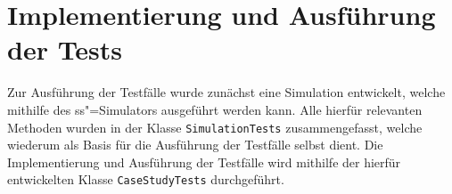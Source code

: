 \chapter{Implementierung und Ausführung der Tests}
\label{chap:testExecution}

Zur Ausführung der Testfälle wurde zunächst eine Simulation entwickelt, welche mithilfe des \ac{ss}"=Simulators ausgeführt werden kann.
Alle hierfür relevanten Methoden wurden in der Klasse \texttt{SimulationTests} zusammengefasst, welche wiederum als Basis für die Ausführung der Testfälle selbst dient.
Die Implementierung und Ausführung der Testfälle wird mithilfe der hierfür entwickelten Klasse \texttt{CaseStudyTests} durchgeführt.








